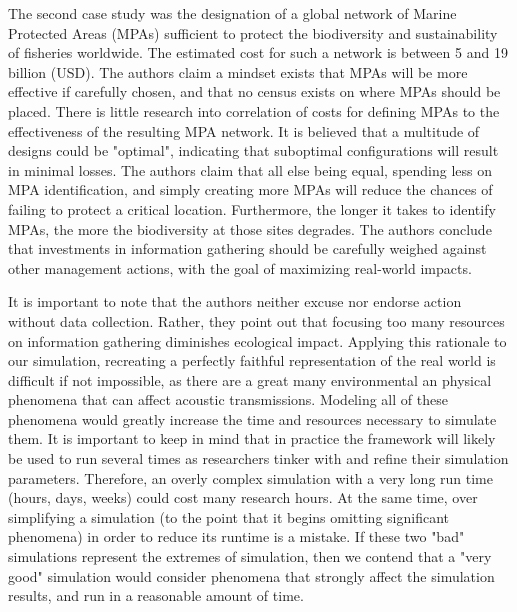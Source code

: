 The second case study was the designation of a global network of Marine Protected Areas (MPAs) sufficient to protect the biodiversity and sustainability of fisheries worldwide.  The estimated cost for such a network is between 5 and 19 billion (USD).  The authors claim a mindset exists that MPAs will be more effective if carefully chosen, and that no census exists on where MPAs should be placed. There is little research into correlation of costs for defining MPAs to the effectiveness of the resulting MPA network.  It is believed that a multitude of designs could be "optimal", indicating that suboptimal configurations will result in minimal losses.  The authors claim that all else being equal, spending less on MPA identification, and simply creating more MPAs will reduce the chances of failing to protect a critical location.  Furthermore, the longer it takes to identify MPAs, the more the biodiversity at those sites degrades.  The authors conclude that investments in information gathering should be carefully weighed against other management actions, with the goal of maximizing real-world impacts.

It is important to note that the authors neither excuse nor endorse action without data collection.  Rather, they point out that focusing too many resources on information gathering diminishes ecological impact.  Applying this rationale to our simulation, recreating a perfectly faithful representation of the real world is difficult if not impossible, as there are a great many environmental an physical phenomena that can affect acoustic transmissions.  Modeling all of these phenomena would greatly increase the time and resources necessary to simulate them.  It is important to keep in mind that in practice the framework will likely be used to run several times as researchers tinker with and refine their simulation parameters.  Therefore, an overly complex simulation with a very long run time (hours, days, weeks) could cost many research hours. At the same time, over simplifying a simulation (to the point that it begins omitting significant phenomena) in order to reduce its runtime is a mistake.  If these two "bad" simulations represent the extremes of simulation, then  we contend that a "very good" simulation would consider phenomena that strongly affect the simulation results, and run in a reasonable amount of time.  



